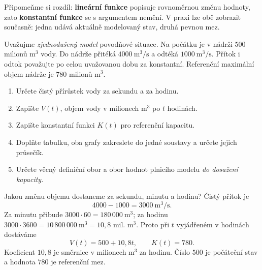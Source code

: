 \documentclass[11pt,a4paper]{article}
\begin{document}

Připomeňme si rozdíl: \textbf{lineární funkce} popisuje rovnoměrnou změnu hodnoty,
zato \textbf{konstantní funkce} se s argumentem nemění. V praxi lze obě zobrazit
současně: jedna udává aktuálně modelovaný stav, druhá pevnou mez.

\begin{zadaniBox}[title={Příklad 1}]
Uvažujme \emph{zjednodušený model} povodňové situace. Na počátku je v nádrži
$500$ milionů $\mathrm{m}^3$ vody. Do nádrže přitéká $4000\ \mathrm{m}^3/\mathrm{s}$
a odtéká $1000\ \mathrm{m}^3/\mathrm{s}$. Přítok i odtok považujte po celou
uvažovanou dobu za konstantní. Referenční maximální objem nádrže je
$780$ milionů $\mathrm{m}^3$.

\begin{enumerate}[label=\alph*)]
\item Určete čistý přírůstek vody za sekundu a za hodinu.
\item Zapište $V(t)$, objem vody v milionech $\mathrm{m}^3$ po $t$ hodinách.
\item Zapište konstantní funkci $K(t)$ pro referenční kapacitu.
\item Doplňte tabulku, oba grafy zakreslete do jedné soustavy a určete jejich průsečík.
\item Určete věcný definiční obor a obor hodnot plnicího modelu \emph{do dosažení kapacity}.
\end{enumerate}
\end{zadaniBox}

\begin{prikladReseniBox}[title={Příklad 2}]
Jakou změnu objemu dostaneme za sekundu, minutu a hodinu?
\tcblower
Čistý přítok je
\[
  4000-1000=3000\ \mathrm{m}^3/\mathrm{s}.
\]
Za minutu přibude $3000\cdot60=180\,000\ \mathrm{m}^3$;
za hodinu $3000\cdot3600=10\,800\,000\ \mathrm{m}^3=10{,}8$ mil. $\mathrm{m}^3$.
Proto při $t$ vyjádřeném v hodinách dostáváme
\[
  V(t)=500+10{,}8t,\qquad K(t)=780.
\]
Koeficient $10{,}8$ je směrnice v milionech $\mathrm{m}^3$ za hodinu.
Číslo $500$ je počáteční stav a hodnota $780$ je referenční mez.
\end{prikladReseniBox}
\end{document}
